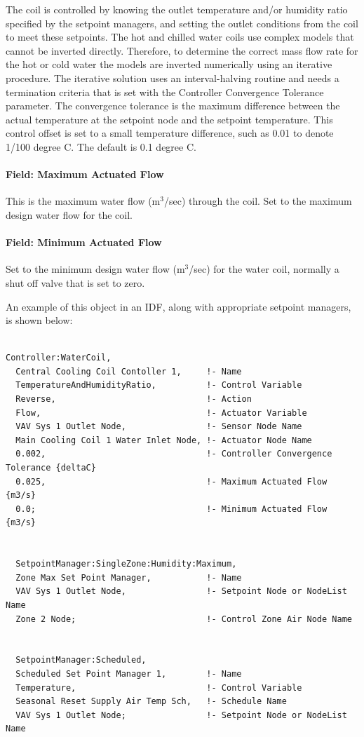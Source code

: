 The coil is controlled by knowing the outlet temperature and/or humidity ratio specified by the setpoint managers, and setting the outlet conditions from the coil to meet these setpoints. The hot and chilled water coils use complex models that cannot be inverted directly. Therefore, to determine the correct mass flow rate for the hot or cold water the models are inverted numerically using an iterative procedure. The iterative solution uses an interval-halving routine and needs a termination criteria that is set with the Controller Convergence Tolerance parameter. The convergence tolerance is the maximum difference between the actual temperature at the setpoint node and the setpoint temperature. This control offset is set to a small temperature difference, such as 0.01 to denote 1/100 degree C. The default is 0.1 degree C.

\paragraph{Field: Maximum Actuated Flow}\label{field-maximum-actuated-flow}

This is the maximum water flow (m\(^{3}\)/sec) through the coil. Set to the maximum design water flow for the coil.

\paragraph{Field: Minimum Actuated Flow}\label{field-minimum-actuated-flow}

Set to the minimum design water flow (m\(^{3}\)/sec) for the water coil, normally a shut off valve that is set to zero.

An example of this object in an IDF, along with appropriate setpoint managers, is shown below:

\begin{lstlisting}

Controller:WaterCoil,
  Central Cooling Coil Contoller 1,     !- Name
  TemperatureAndHumidityRatio,          !- Control Variable
  Reverse,                              !- Action
  Flow,                                 !- Actuator Variable
  VAV Sys 1 Outlet Node,                !- Sensor Node Name
  Main Cooling Coil 1 Water Inlet Node, !- Actuator Node Name
  0.002,                                !- Controller Convergence Tolerance {deltaC}
  0.025,                                !- Maximum Actuated Flow {m3/s}
  0.0;                                  !- Minimum Actuated Flow {m3/s}


  SetpointManager:SingleZone:Humidity:Maximum,
  Zone Max Set Point Manager,           !- Name
  VAV Sys 1 Outlet Node,                !- Setpoint Node or NodeList Name
  Zone 2 Node;                          !- Control Zone Air Node Name


  SetpointManager:Scheduled,
  Scheduled Set Point Manager 1,        !- Name
  Temperature,                          !- Control Variable
  Seasonal Reset Supply Air Temp Sch,   !- Schedule Name
  VAV Sys 1 Outlet Node;                !- Setpoint Node or NodeList Name
\end{lstlisting}

